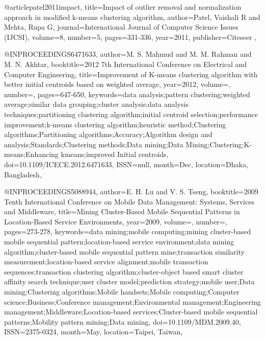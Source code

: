@article{patel2011impact,
  title={Impact of outlier removal and normalization approach in modified k-means clustering algorithm},
  author={Patel, Vaishali R and Mehta, Rupa G},
  journal={International Journal of Computer Science Issues (IJCSI)},
  volume={8},
  number={5},
  pages={331-336},
  year={2011},
  publisher={Citeseer}
},

@INPROCEEDINGS{6471633, 
author={M. S. {Mahmud} and M. M. {Rahman} and M. N. {Akhtar}}, 
booktitle={2012 7th International Conference on Electrical and Computer Engineering}, 
title={Improvement of K-means clustering algorithm with better initial centroids based on weighted average}, 
year={2012}, 
volume={}, 
number={}, 
pages={647-650}, 
keywords={data analysis;pattern clustering;weighted average;similar data grouping;cluster analysis;data analysis techniques;partitioning clustering algorithm;initial centroid selection;performance improvement;k-means clustering algorithm;heuristic method;Clustering algorithms;Partitioning algorithms;Accuracy;Algorithm design and analysis;Standards;Clustering methods;Data mining;Data Mining;Clustering;K-means;Enhancing kmeans;improved Initial centroids}, 
doi={10.1109/ICECE.2012.6471633}, 
ISSN={null}, 
month={Dec},
location={Dhaka, Bangladesh}},

@INPROCEEDINGS{5088944, 
author={E. H. {Lu} and V. S. {Tseng}}, 
booktitle={2009 Tenth International Conference on Mobile Data Management: Systems, Services and Middleware}, 
title={Mining Cluster-Based Mobile Sequential Patterns in Location-Based Service Environments}, 
year={2009}, 
volume={}, 
number={}, 
pages={273-278}, 
keywords={data mining;mobile computing;mining cluster-based mobile sequential pattern;location-based service environment;data mining algorithm;cluster-based mobile sequential pattern mine;transaction similarity measurement;location-based service alignment;mobile transaction sequences;transaction clustering algorithm;cluster-object based smart cluster affinity search technique;user cluster model;prediction strategy;mobile user;Data mining;Clustering algorithms;Mobile handsets;Mobile computing;Computer science;Business;Conference management;Environmental management;Engineering management;Middleware;Location-based services;Cluster-based mobile sequential patterns;Mobility pattern mining;Data mining}, 
doi={10.1109/MDM.2009.40}, 
ISSN={2375-0324}, 
month={May},
location={Taipei, Taiwan}},



